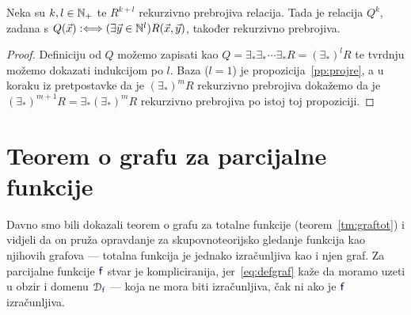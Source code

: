 \begin{korolar}[{name=[višestruka projekcija čuva rekurzivnu prebrojivost]}]\label{kor:projre}
Neka su $k,l\in{\mathbb N}_+$ te $R^{k+l}$ rekurzivno prebrojiva relacija. Tada je relacija $Q^k$, zadana s $Q(\vec x):\Longleftrightarrow(\exists\vec y\in{\mathbb N}^l)R(\vec x,\vec y)$, također rekurzivno prebrojiva.
\end{korolar}
\begin{proof}
%
Definiciju od $Q$ možemo zapisati kao $Q=\exists_*\exists_*\mspace{1mu}\dotsi\exists_*R=(\exists_*\!)^lR$ te tvrdnju možemo dokazati indukcijom po $l$. Baza ($l=1$) je propozicija~\ref{pp:projre}, a u koraku iz pretpostavke da je $(\exists_*\!)^mR$ rekurzivno prebrojiva dokažemo da je $(\exists_*\!)^{m+1}R=\exists_*(\exists_*\!)^mR$ rekurzivno prebrojiva po istoj toj propoziciji.
\end{proof}

\section{Teorem o grafu za parcijalne funkcije}

Davno smo bili dokazali teorem o grafu za totalne funkcije (teorem~\ref{tm:graftot}) i vidjeli da on pruža opravdanje za skupovnoteorijsko gledanje funkcija kao njihovih grafova --- totalna funkcija je jednako izračunljiva kao i njen graf. Za parcijalne funkcije $\f f$ stvar je kompliciranija, jer~\eqref{eq:defgraf} kaže da moramo uzeti u obzir i domenu $\dom{\f f}$ --- koja ne mora biti izračunljiva, čak ni ako je $\f f$ izračunljiva.


